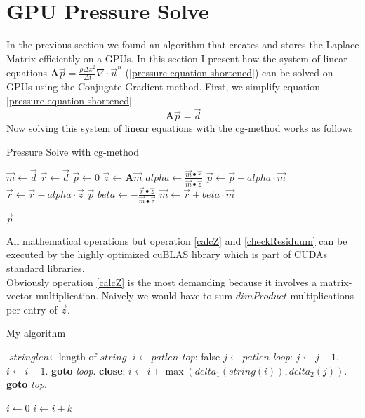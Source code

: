 \section{GPU Pressure Solve}
In the previous section we found an algorithm that creates and stores the Laplace Matrix efficiently on a GPUs. In this section I present how the system of linear equations $\mathbf{A}\vec{p} = \frac{\rho \Delta x^2}{\Delta t}\nabla \cdot \vec{u}^n$ (\ref{pressure-equation-shortened}) can be solved on GPUs using the Conjugate Gradient method. First, we simplify equation \ref{pressure-equation-shortened}
\begin{equation}
	\mathbf{A}\vec{p} = \vec{d} 
\end{equation}
Now solving this system of linear equations with the cg-method works as follows

\begin{algorithm}
\caption{Pressure Solve with cg-method}\label{pressure-solve-cg}
\begin{algorithmic}[1]
	\State $\vec{m} \gets \vec{d}$ 
	\State $\vec{r} \gets \vec{d}$
	\State $\vec{p} \gets 0$ 
		\State $\vec{z} \gets \mathbf{A} \vec{m}$ \label{calcZ} 
		\State $alpha \gets \frac{\vec{m} \bullet \vec{r}}{\vec{m} \bullet \vec{z}}$
		\State $\vec{p} \gets \vec{p} + alpha \cdot \vec{m}$
		\State $\vec{r} \gets \vec{r} - alpha \cdot \vec{z}$
		 \label{checkResiduum}  
			\State \Return $\vec{p}$
		\EndIf
		\State $beta \gets - \frac{\vec{r} \bullet \vec{z}}{\vec{m} \bullet \vec{z}}$
		\State $\vec{m} \gets \vec{r} + beta \cdot \vec{m}$
	\EndFor

\State \Return $\vec{p}$
\EndFunction
\end{algorithmic}
\end{algorithm}
All mathematical operations but operation \ref{calcZ} and \ref{checkResiduum} can be executed by the highly optimized cuBLAS library which is part of CUDAs standard libraries. \\
Obviously operation \ref{calcZ} is the most demanding because it involves a matrix-vector multiplication. Naively we would have to sum $dimProduct$ multiplications per entry of $\vec{z}$.

\newpage
\begin{algorithm}
\caption{My algorithm}\label{euclid}
\begin{algorithmic}[1]
\State $\textit{stringlen} \gets \text{length of }\textit{string}$
\State $i \gets \textit{patlen}$
\BState \emph{top}:
 \Return false
\EndIf
\State $j \gets \textit{patlen}$
\BState \emph{loop}:
\State $j \gets j-1$.
\State $i \gets i-1$.
\State \textbf{goto} \emph{loop}.
\State \textbf{close};
\EndIf
\State $i \gets i+\max(\textit{delta}_1(\textit{string}(i)),\textit{delta}_2(j))$.
\State \textbf{goto} \emph{top}.
\EndProcedure
\end{algorithmic}
\end{algorithm}

\begin{algorithmic}
    \State $i\gets 0$
\Else
        \State $i\gets i+k$
    \EndIf
\EndIf
\end{algorithmic}